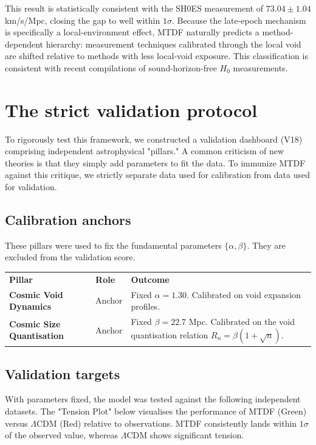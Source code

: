 \documentclass[11pt,a4paper]{article}
\begin{document}
This result is statistically consistent with the SH0ES measurement of $73.04 \pm 1.04$ km/\allowbreak{}s/\allowbreak{}Mpc, closing the gap to well within $1\sigma$. Because the late-epoch mechanism is specifically a local-environment effect, MTDF naturally predicts a method-dependent hierarchy: measurement techniques calibrated through the local void are shifted relative to methods with less local-void exposure. This classification is consistent with recent compilations of sound-horizon-free $H_0$ measurements.

\section{The strict validation protocol}
\label{sec:sec7}
To rigorously test this framework, we constructed a validation dashboard (V18) comprising independent astrophysical "pillars." A common criticism of new theories is that they simply add parameters to fit the data. To immunize MTDF against this critique, we strictly separate data used for calibration from data used for validation.

\subsection{Calibration anchors}
These pillars were used to fix the fundamental parameters $\{\alpha, \beta\}$. They are excluded from the validation score.

\begin{table}[H]
\centering
\footnotesize
\begin{tabularx}{\linewidth}{l>{\RaggedRight\arraybackslash}X>{\RaggedRight\arraybackslash}X}
\toprule
\textbf{Pillar} & \textbf{Role} & \textbf{Outcome} \tabularnewline
\textbf{Cosmic Void Dynamics} & Anchor & Fixed $\alpha = 1.30$. Calibrated on void expansion profiles. \tabularnewline
\textbf{Cosmic Size Quantisation} & Anchor & Fixed $\beta = 22.7$ Mpc. Calibrated on the void quantisation relation $R_n = \beta(1 + \sqrt{n})$. \tabularnewline
\bottomrule
\end{tabularx}
\end{table}

\subsection{Validation targets}
With parameters fixed, the model was tested against the following independent datasets. The "Tension Plot" below visualises the performance of MTDF (Green) versus $\Lambda$CDM (Red) relative to observations. MTDF consistently lands within $1\sigma$ of the observed value, whereas $\Lambda$CDM shows significant tension.
\end{document}
